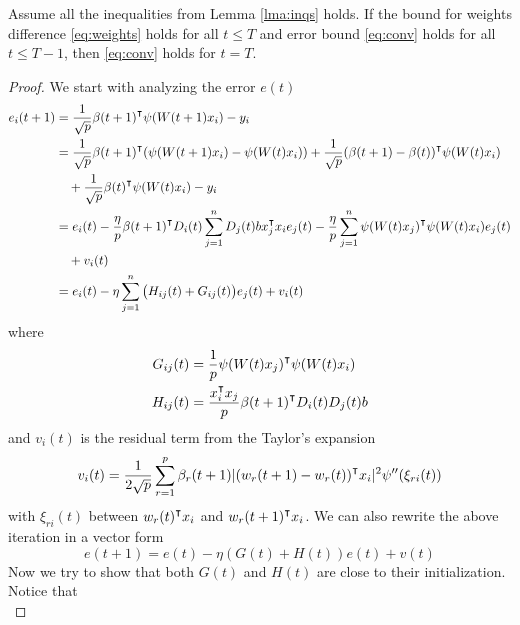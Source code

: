 \begin{lemma}
\label{lma:induction}
Assume all the inequalities from Lemma \ref{lma:inqs} holds. If the bound for weights difference \eqref{eq:weights} holds for all $t\leq T$ and error bound \eqref{eq:conv} holds for all $t\leq T-1$, then \eqref{eq:conv} holds for $t=T$.
\end{lemma}
\begin{proof}
We start with analyzing the error $e(t)$
\begin{equation*}
\begin{aligned}
    e_i(t+1) 
    &= \frac{1}{\sqrt p}\beta(t+1)\transpose\psi(W(t+1)x_i) - y_i \\
    &= \frac{1}{\sqrt p}\beta(t+1)\transpose(\psi(W(t+1)x_i)-\psi(W(t)x_i))+ \frac{1}{\sqrt p}(\beta(t+1)-\beta(t))\transpose \psi(W(t)x_i) \\
    & \quad + \frac{1}{\sqrt p}\beta(t)\transpose \psi(W(t)x_i) - y_i \\
    &=e_i(t) - \frac{\eta}{p}\beta(t+1)\transpose D_i(t)\sum_{j=1}^nD_j(t)b x_j\transpose x_i e_j(t)  - \frac{\eta}{p}\sum_{j=1}^n\psi(W(t)x_j)\transpose\psi(W(t)x_i)e_j(t) \\
    & \quad + v_i(t) \\
    & = e_i(t)-\eta\sum_{j=1}^n\big(H_{ij}(t)+G_{ij}(t)\big)e_j(t) + v_i(t)
\end{aligned}
\end{equation*}
where
\begin{equation*}
\begin{aligned}
G_{ij}(t) &= \frac{1}{p}\psi(W(t)x_j)\transpose\psi(W(t)x_i) \\
H_{ij}(t) &= \frac{x_i\transpose x_j}{p}\beta(t+1)\transpose D_i(t)D_j(t)b
\end{aligned}
\end{equation*}
and $v_i(t)$ is the residual term from the Taylor's expansion
\begin{equation*}
    v_i(t) = \frac{1}{2\sqrt p}\sum_{r=1}^p\beta_r(t+1)|(w_r(t+1)-w_r(t))\transpose x_i|^2\psi''(\xi_{ri}(t))
\end{equation*}
with $\xi_{ri}(t)$ between $w_r(t)\transpose x_i$ and $w_r(t+1)\transpose x_i$. We can also rewrite the above iteration in a vector form
\begin{equation}\label{eq:et_iter}
     e(t+1) = e(t) - \eta(G(t)+H(t))e(t) + v(t)
\end{equation} 
Now we try to show that both $G(t)$ and $H(t)$ are close to their initialization. Notice that
\begin{equation*}

\end{equation*}
\end{proof}
